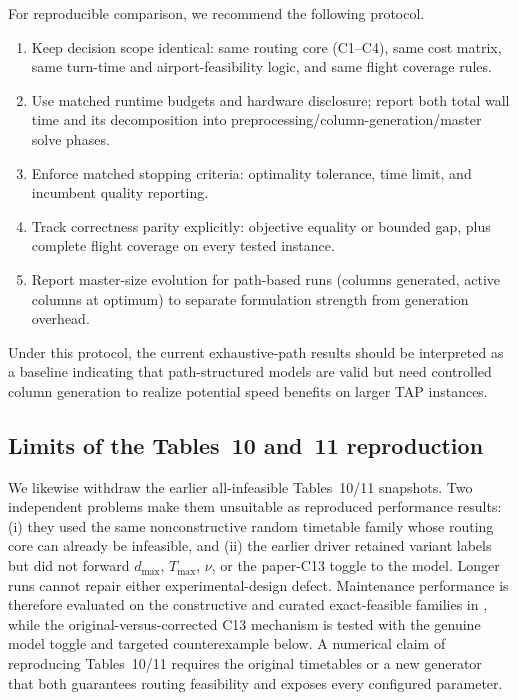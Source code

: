 For reproducible comparison, we recommend the following protocol.
\begin{enumerate}
  \item Keep decision scope identical: same routing core (C1--C4), same cost
    matrix, same turn-time and airport-feasibility logic, and same flight
    coverage rules.
  \item Use matched runtime budgets and hardware disclosure; report both total
    wall time and its decomposition into preprocessing/column-generation/master
    solve phases.
  \item Enforce matched stopping criteria: optimality tolerance, time limit,
    and incumbent quality reporting.
  \item Track correctness parity explicitly: objective equality or bounded gap,
    plus complete flight coverage on every tested instance.
  \item Report master-size evolution for path-based runs (columns generated,
    active columns at optimum) to separate formulation strength from generation
    overhead.
\end{enumerate}

Under this protocol, the current exhaustive-path results should be interpreted
as a baseline indicating that path-structured models are valid but need
controlled column generation to realize potential speed benefits on larger TAP
instances.

\subsection{Limits of the Tables~10 and~11 reproduction}

We likewise withdraw the earlier all-infeasible Tables~10/11 snapshots.  Two
independent problems make them unsuitable as reproduced performance results:
(i) they used the same nonconstructive random timetable family whose routing
core can already be infeasible, and (ii) the earlier driver retained variant
labels but did not forward $d_{\max}$, $T_{\max}$, $\nu$, or the paper-C13
toggle to the model.  Longer runs cannot repair either experimental-design
defect.  Maintenance performance is therefore evaluated on the constructive
and curated exact-feasible families in , while
the original-versus-corrected C13 mechanism is tested with the genuine model
toggle and targeted counterexample below.  A numerical claim of reproducing
Tables~10/11 requires the original timetables or a new generator that both
guarantees routing feasibility and exposes every configured parameter.

